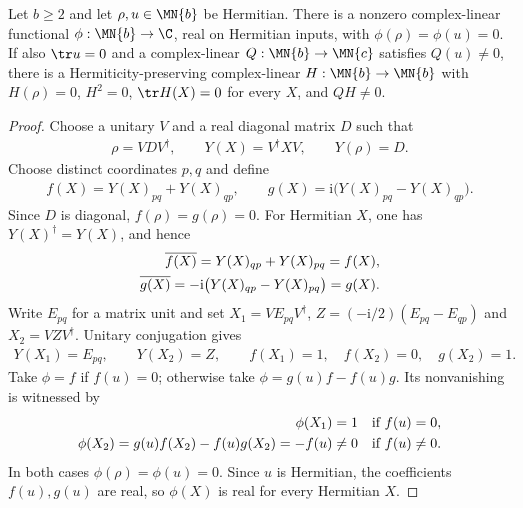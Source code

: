 \begin{lemma}
    \label{thm:hermitian_pair_annihilator}
    \leanok
    Let $b\ge2$ and let $\rho,u\in \MN{b}$ be Hermitian.
    There is a nonzero complex-linear functional $\phi:\MN{b}\to\C$,
    real on Hermitian inputs, with $\phi(\rho)=\phi(u)=0$.
    If also $\tr u=0$ and a complex-linear $Q:\MN{b}\to \MN{c}$
    satisfies $Q(u)\ne0$, there is a Hermiticity-preserving complex-linear
    $H:\MN{b}\to \MN{b}$ with $H(\rho)=0$, $H^2=0$,
    $\tr H(X)=0$ for every $X$, and $QH\ne0$.
\end{lemma}

\begin{proof}
    \leanok
    Choose a unitary $V$ and a real diagonal matrix $D$ such that
    \begin{align}
        \rho=VDV^\dagger,\qquad
        Y(X)=V^\dagger XV,\qquad Y(\rho)=D.
        \label{eq:hermitian_pair_spectral_coordinates}
    \end{align}
    Choose distinct coordinates $p,q$ and define
    \begin{align}
        f(X)=Y(X)_{pq}+Y(X)_{qp},\qquad
        g(X)=\mathrm{i}\bigl(Y(X)_{pq}-Y(X)_{qp}\bigr).
        \label{eq:hermitian_pair_off_diagonal_functionals}
    \end{align}
    Since $D$ is diagonal, $f(\rho)=g(\rho)=0$.
    For Hermitian $X$, one has $Y(X)^\dagger=Y(X)$, and hence
    \begin{align}
        \overline{f(X)}=Y(X)_{qp}+Y(X)_{pq}=f(X),\notag\\
        \overline{g(X)}=-\mathrm{i}\bigl(Y(X)_{qp}-Y(X)_{pq}\bigr)=g(X).
        \label{eq:hermitian_pair_real_functionals}
    \end{align}
    Write $E_{pq}$ for a matrix unit and set
    $X_1=VE_{pq}V^\dagger$,
    $Z=(-\mathrm{i}/2)(E_{pq}-E_{qp})$ and $X_2=VZV^\dagger$.
    Unitary conjugation gives
    \begin{align}
        Y(X_1)=E_{pq},\qquad Y(X_2)=Z,\qquad
        f(X_1)=1,\quad f(X_2)=0,\quad g(X_2)=1.
        \label{eq:hermitian_pair_functional_witnesses}
    \end{align}
    Take $\phi=f$ if $f(u)=0$; otherwise take
    $\phi=g(u)f-f(u)g$. Its nonvanishing is witnessed by
    \begin{align}
        \phi(X_1)=1\quad\text{if }f(u)=0,\notag\\
        \phi(X_2)=g(u)f(X_2)-f(u)g(X_2)=-f(u)\ne0
        \quad\text{if }f(u)\ne0.
        \label{eq:hermitian_pair_phi_nonzero}
    \end{align}
    In both cases $\phi(\rho)=\phi(u)=0$. Since $u$ is Hermitian,
    the coefficients $f(u),g(u)$ are real, so $\phi(X)$ is real
    for every Hermitian $X$.


\end{proof}
